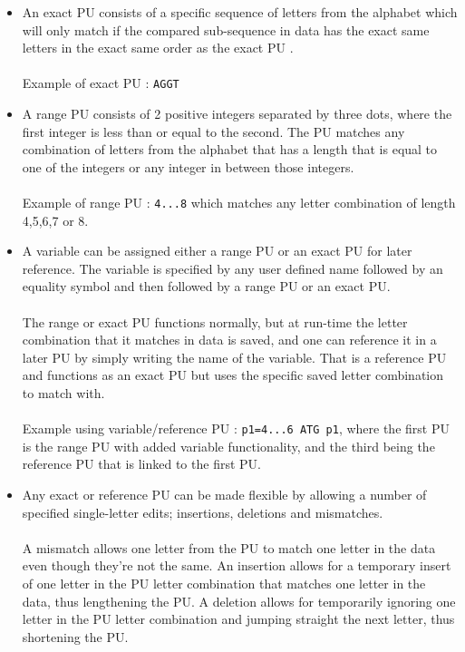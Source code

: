 \documentclass[12pt]{article}
\newcommand{\pu}{PU }
\newcommand{\pup}{PU. }
\begin{document}
\begin{itemize}
\item An exact \pu consists of a specific sequence of letters from the alphabet which will
only match if the compared sub-sequence in data has the exact same letters in the exact same order as the 
exact \pu. \\ \\
Example of exact \pu : \texttt{AGGT}
\item A range \pu consists of 2 positive integers separated by three dots, where the first integer is less than or
equal to the second. The \pu matches any combination of
letters from the alphabet that has a length that is equal to one of the integers or any integer in between those integers. \\ \\
Example of range \pu : \texttt{4...8} which matches any letter combination of length 4,5,6,7 or 8.
\item A variable can be assigned either a range \pu or an exact \pu for later reference. The variable is specified by 
any user defined name
followed by an equality symbol and then followed by a range \pu or an exact \pup \\ \\
The range or exact PU functions normally, but at run-time the letter combination that it matches
in data is saved, and one can reference it in a later \pu by simply writing the name of the variable. That is a
reference \pu and functions as an exact \pu but uses the specific saved 
letter combination to match with. \\ \\
Example using variable/reference \pu : \texttt{p1=4...6\; ATG\; p1}, where
the first \pu is the range \pu with added variable functionality, 
and the third being the reference \pu that is linked to the first \pup
\item Any exact or reference \pu can be made flexible by allowing a number of specified
single-letter edits; insertions, deletions and mismatches. \\ \\
A mismatch allows one letter from the \pu to match one letter in the data even though they're not the same.
An insertion allows for a temporary insert of one letter in the \pu letter combination that matches one letter in
the data, thus lengthening the \pup A deletion allows for temporarily ignoring one letter in the \pu letter combination
and jumping straight the next letter, thus shortening the \pup \\

\end{itemize}
\end{document}
